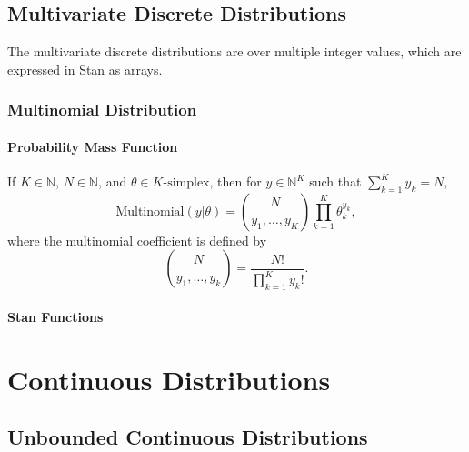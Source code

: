 \begin{description}
{\begin{description}
\chapter{Multivariate Discrete Distributions}


The multivariate discrete distributions are over multiple integer values, which are expressed in Stan as arrays.


\section{Multinomial Distribution}


\subsection{Probability Mass Function}


If $K \in \mathbb{N}$, $N \in \mathbb{N}$, and $\theta \in \text{$K$-simplex}$, then for $y \in \mathbb{N}^K$ such that $\sum_{k=1}^K y_k = N$, \[ \text{Multinomial}(y|\theta) = \binom{N}{y_1,\ldots,y_K} \prod_{k=1}^K \theta_k^{y_k}, \] where the multinomial coefficient is defined by \[ \binom{N}{y_1,\ldots,y_k} = \frac{N!}{\prod_{k=1}^K y_k!}. \] 



\subsection{Stan Functions}


\begin{description}    \end{description}


\part{Continuous Distributions}\label{continuous-prob-functions.part}


\chapter{Unbounded Continuous Distributions}



\end{description}}
\end{description}
